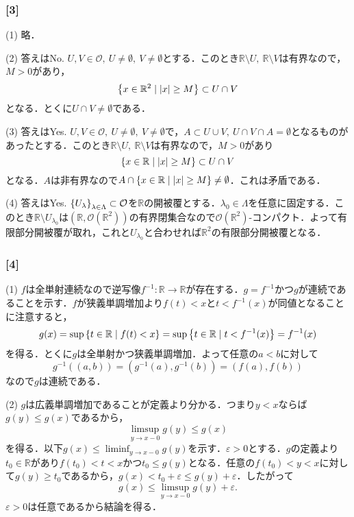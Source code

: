\documentclass[a4j]{ltjsarticle}
\newcommand{\Rset}{\mathbb{R}}
\newcommand{\1}{\mathbbm{1}}
\numberwithin{equation}{section}
\theoremstyle{definition}
\begin{document}
\subsubsection*{[3]}
(1) 略．

(2) 答えはNo. $U,V\in\mathcal{O},\ U\neq\emptyset,\ V\neq \emptyset$とする．このとき$\Rset\setminus U,\ \Rset\setminus V$は有界なので，$M>0$があり，
\begin{equation}
    \qty{x\in\Rset^2\mid \abs{x}\geq M}\subset U\cap V 
\end{equation}
となる．とくに$U\cap V\neq\emptyset$である．

(3) 答えはYes. $U,V\in\mathcal{O},\ U\neq\emptyset,\ V\neq\emptyset$で，$A\subset U\cup V,\ U\cap V\cap A=\emptyset $となるものがあったとする．このとき$\Rset\setminus U,\ \Rset\setminus V$は有界なので，$M>0$があり
\begin{equation}
    \qty{x\in\Rset\mid \abs{x}\geq M}\subset U\cap V 
\end{equation}
となる．$A$は非有界なので$A\cap \qty{x\in\Rset\mid \abs{x}\geq M}\neq\emptyset$．これは矛盾である．

(4) 答えはYes. $\qty{U_{\lambda}}_{\lambda\in\Lambda}\subset \mathcal{O}$を$\Rset$の開被覆とする．$\lambda_{0}\in\Lambda$を任意に固定する．このとき$\Rset\setminus U_{\lambda_{0}}$は$(\Rset,\mathcal{O}(\Rset^2))$の有界閉集合なので$\mathcal{O}(\Rset^2)$-コンパクト．よって有限部分開被覆が取れ，これと$U_{\lambda_{0}}$と合わせれば$\Rset^2$の有限部分開被覆となる．
\subsubsection*{[4]}
(1) $f$は全単射連続なので逆写像$f^{-1}\colon \Rset\to\Rset$が存在する．$g=f^{-1}$かつ$g$が連続であることを示す．$f$が狭義単調増加より$f(t)<x$と$t<f^{-1}(x)$が同値となることに注意すると，
\begin{equation}
    g(x)=\sup\qty{t\in\Rset\mid f(t)<x}=\sup\qty{t\in\Rset\mid t<f^{-1}(x)}=f^{-1}(x)
\end{equation}
を得る．とくに$g$は全単射かつ狭義単調増加．よって任意の$a<b$に対して
\begin{equation}
    g^{-1}((a,b))=(g^{-1}(a),g^{-1}(b))=(f(a),f(b))
\end{equation}
なので$g$は連続である．

(2) $g$は広義単調増加であることが定義より分かる．つまり$y<x$ならば$g(y)\leq g(x)$であるから，
\begin{equation}
    \limsup_{y\to x-0}g(y)\leq g(x)
\end{equation}
を得る．以下$g(x)\leq \liminf_{y\to x-0}g(y)$を示す．$\varepsilon>0$とする．$g$の定義より$t_0\in\Rset$があり$f(t_0)<t<x$かつ$t_0\leq g(y)$となる．任意の$f(t_0)<y<x$に対して$g(y)\geq t_0$であるから，$g(x)<t_0+\varepsilon\leq g(y)+\varepsilon$．したがって
\begin{equation}
    g(x)\leq\limsup_{y\to x-0}g(y)+\varepsilon .
\end{equation}
$\varepsilon>0$は任意であるから結論を得る．
\end{document}
